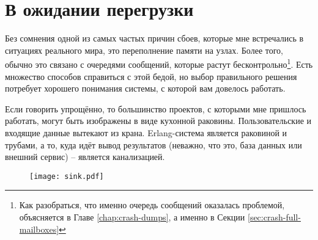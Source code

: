 \documentclass[11pt, oneside]{book}   	%
\begin{document}

\chapter{В ожидании перегрузки}
\label{chap:overload}

Без сомнения одной из самых частых причин сбоев, которые мне встречались в ситуациях реального мира, это переполнение памяти на узлах. Более того, обычно это связано с очередями сообщений, которые растут бесконтрольно\footnote{Как разобраться, что именно очередь сообщений оказалась проблемой, объясняется в Главе \ref{chap:crash-dumps}, а именно в Секции \ref{sec:crash-full-mailboxes}}. Есть множество способов справиться с этой бедой, но выбор правильного решения потребует хорошего понимания системы, с которой вам довелось работать.

Если говорить упрощённо, то большинство проектов, с которыми мне пришлось работать, могут быть изображены в виде кухонной раковины. Пользовательские и входящие данные вытекают из крана. Erlang-система является раковиной и трубами, а то, куда идёт вывод результатов (неважно, что это, база данных или внешний сервис) -- является канализацией.

\begin{figure}[h!]
  \texttt{[image: sink.pdf]}%
  \centering%
   \label{fig:tracing-venn}
\end{figure}
\end{document}
